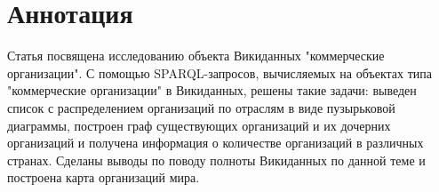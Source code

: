 \section*{Аннотация}

Статья посвящена исследованию объекта Викиданных "коммерческие организации". С помощью SPARQL-запросов, вычисляемых на объектах типа "коммерческие организации" в Викиданных, решены такие задачи: выведен список с распределением организаций по отраслям в виде пузырьковой диаграммы, построен граф существующих организаций и их дочерних организаций и получена информация о количестве организаций в различных странах. Сделаны выводы по поводу полноты Викиданных по данной теме и построена карта организаций мира.
